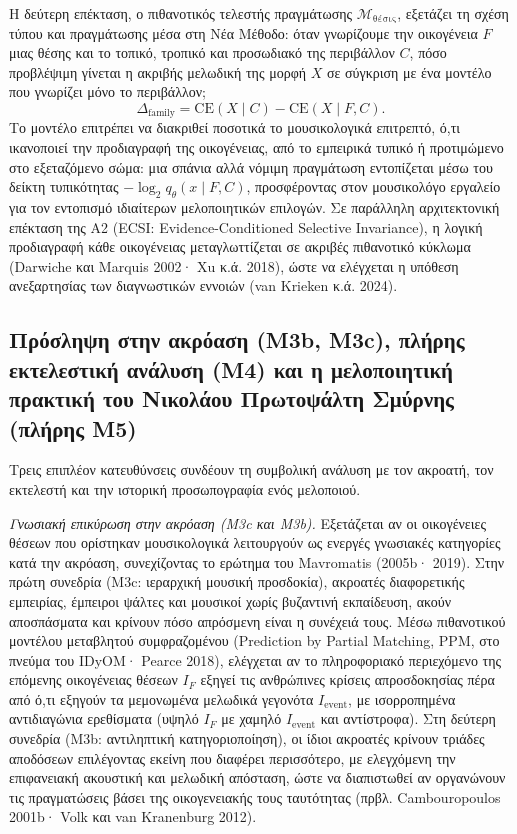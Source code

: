 \documentclass[11pt,a4paper]{article}
\newcommand{\Mth}{\mathcal{M}_{\text{θέσις}}}
\begin{document}
Η δεύτερη επέκταση, ο πιθανοτικός τελεστής πραγμάτωσης $\Mth$, εξετάζει τη σχέση τύπου και πραγμάτωσης μέσα στη Νέα Μέθοδο: όταν γνωρίζουμε την οικογένεια $F$ μιας θέσης και το τοπικό, τροπικό και προσωδιακό της περιβάλλον $C$, πόσο προβλέψιμη γίνεται η ακριβής μελωδική της μορφή $X$ σε σύγκριση με ένα μοντέλο που γνωρίζει μόνο το περιβάλλον;
\[
\Delta_{\text{family}}=\mathrm{CE}(X\mid C)-\mathrm{CE}(X\mid F,C).
\]
Το μοντέλο επιτρέπει να διακριθεί ποσοτικά το μουσικολογικά επιτρεπτό, ό,τι ικανοποιεί την προδιαγραφή της οικογένειας, από το εμπειρικά τυπικό ή προτιμώμενο στο εξεταζόμενο σώμα: μια σπάνια αλλά νόμιμη πραγμάτωση εντοπίζεται μέσω του δείκτη τυπικότητας $-\log_2 q_\theta(x\mid F,C)$, προσφέροντας στον μουσικολόγο εργαλείο για τον εντοπισμό ιδιαίτερων μελοποιητικών επιλογών. Σε παράλληλη αρχιτεκτονική επέκταση της Α2 (ECSI: Evidence-Conditioned Selective Invariance), η λογική προδιαγραφή κάθε οικογένειας μεταγλωττίζεται σε ακριβές πιθανοτικό κύκλωμα (Darwiche και Marquis 2002· Xu κ.ά. 2018), ώστε να ελέγχεται η υπόθεση ανεξαρτησίας των διαγνωστικών εννοιών (van Krieken κ.ά. 2024).

\subsection{Πρόσληψη στην ακρόαση (Μ3b, Μ3c), πλήρης εκτελεστική ανάλυση (Μ4) και η μελοποιητική πρακτική του Νικολάου Πρωτοψάλτη Σμύρνης (πλήρης Μ5)}

Τρεις επιπλέον κατευθύνσεις συνδέουν τη συμβολική ανάλυση με τον ακροατή, τον εκτελεστή και την ιστορική προσωπογραφία ενός μελοποιού.

\emph{Γνωσιακή επικύρωση στην ακρόαση (Μ3c και Μ3b).} Εξετάζεται αν οι οικογένειες θέσεων που ορίστηκαν μουσικολογικά λειτουργούν ως ενεργές γνωσιακές κατηγορίες κατά την ακρόαση, συνεχίζοντας το ερώτημα του Mavromatis (2005b· 2019). Στην πρώτη συνεδρία (Μ3c: ιεραρχική μουσική προσδοκία), ακροατές διαφορετικής εμπειρίας, έμπειροι ψάλτες και μουσικοί χωρίς βυζαντινή εκπαίδευση, ακούν αποσπάσματα και κρίνουν πόσο απρόσμενη είναι η συνέχειά τους. Μέσω πιθανοτικού μοντέλου μεταβλητού συμφραζομένου (Prediction by Partial Matching, PPM, στο πνεύμα του IDyOM· Pearce 2018), ελέγχεται αν το πληροφοριακό περιεχόμενο της επόμενης οικογένειας θέσεων $I_F$ εξηγεί τις ανθρώπινες κρίσεις απροσδοκησίας πέρα από ό,τι εξηγούν τα μεμονωμένα μελωδικά γεγονότα $I_{\text{event}}$, με ισορροπημένα αντιδιαγώνια ερεθίσματα (υψηλό $I_F$ με χαμηλό $I_{\text{event}}$ και αντίστροφα). Στη δεύτερη συνεδρία (Μ3b: αντιληπτική κατηγοριοποίηση), οι ίδιοι ακροατές κρίνουν τριάδες αποδόσεων επιλέγοντας εκείνη που διαφέρει περισσότερο, με ελεγχόμενη την επιφανειακή ακουστική και μελωδική απόσταση, ώστε να διαπιστωθεί αν οργανώνουν τις πραγματώσεις βάσει της οικογενειακής τους ταυτότητας (πρβλ. Cambouropoulos 2001b· Volk και van Kranenburg 2012).
\end{document}
